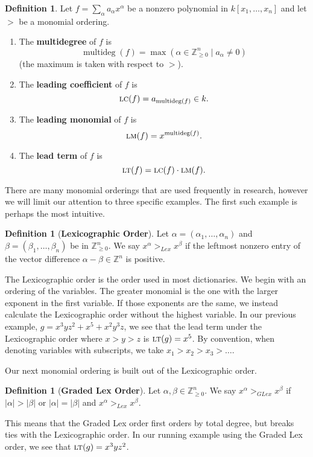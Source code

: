 \documentclass[MS, xcolor=dvipsnames]{wfuthesis}
\def\bZ{\mathbb{Z}}
\newcommand{\LT}{\ensuremath{\text{\sc lt}}}
\newcommand{\LM}{\ensuremath{\text{\sc lm}}}
\newcommand{\LC}{\ensuremath{\text{\sc lc}}}
\DeclareMathOperator{\multideg}{multideg}
\theoremstyle{definition}
\newtheorem{definition}[theorem]{Definition}
\begin{document}
\begin{definition}
  Let $f = \sum_\alpha a_\alpha x^\alpha$ be a nonzero polynomial in $k[x_1,\dots,x_n]$ and let $>$ be a monomial ordering.
  \begin{enumerate}[label=(\roman*)]
    \item The \textbf{multidegree} of $f$ is
    \[ \multideg(f) = \max(\alpha \in \bZ_{\ge0}^n \mid a_\alpha \ne 0) \]
    (the maximum is taken with respect to $>$).
    \item The \textbf{leading coefficient} of $f$ is
    \[ \LC(f) = a_{\multideg(f)} \in k. \]
    \item The \textbf{leading monomial} of $f$ is
    \[ \LM(f) = x^{\multideg(f)}. \]
    \item The \textbf{lead term} of $f$ is
    \[ \LT(f) = \LC(f) \cdot \LM(f). \]
  \end{enumerate}
\end{definition}
There are many monomial orderings that are used frequently in research, however we will limit our attention to three specific examples. The first such example is perhaps the most intuitive.
\begin{definition}[\bf Lexicographic Order]
  Let $\alpha = (\alpha_1, \dots, \alpha_n)$ and $\beta = (\beta_1,\dots,\beta_n)$ be in $\bZ_{\ge0}^n$. We say $x^\alpha >_{Lex} x^\beta$ if the leftmost nonzero entry of the vector difference $\alpha - \beta \in \bZ^n$ is positive.
\end{definition}
The Lexicographic order is the order used in most dictionaries. We begin with an ordering of the variables. The greater monomial is the one with the larger exponent in the first variable. If those exponents are the same, we instead calculate the Lexicographic order without the highest variable. In our previous example, $g = x^3yz^2 + x^5 + x^2y^3z$, we see that the lead term under the Lexicographic order where $x>y>z$ is $\LT(g)=x^5$. By convention, when denoting variables with subscripts, we take $x_1 > x_2 > x_3 > \dots$. \par
Our next monomial ordering is built out of the Lexicographic order.
\begin{definition}[\bf Graded Lex Order]
  Let $\alpha,\beta \in \bZ_{\ge0}^n$. We say $x^\alpha >_{GLex} x^\beta$ if $|\alpha| > |\beta|$ or $|\alpha|=|\beta|$ and $x^\alpha >_{Lex} x^\beta$.
\end{definition}
This means that the Graded Lex order first orders by total degree, but breaks ties with the Lexicographic order. In our running example using the Graded Lex order, we see that $\LT(g)=x^3yz^2$. \par
\end{document}
